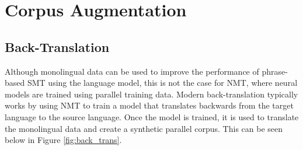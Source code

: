 












\section{Corpus Augmentation}

\subsection{Back-Translation}
Although monolingual data can be used to improve the performance of phrase-based \acrfull{SMT} using the language model, this is not the case for \acrshort{NMT}, where neural models are trained using parallel training data. Modern back-translation typically works by using \acrshort{NMT} to train a model that translates backwards from the target language to the source language. Once the model is trained, it is used to translate the monolingual data and create a synthetic parallel corpus. This can be seen below in Figure \ref{fig:back_trans}.

